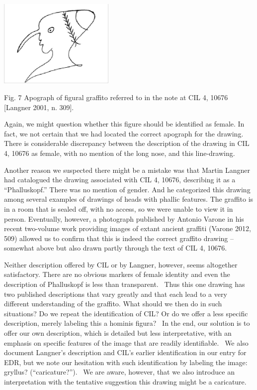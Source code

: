 \documentclass[amsthm,ebook]{saparticle}
\begin{document}
\bigskip

 \includegraphics[width=5.553cm,height=4.217cm]{EAGLE2016BenefielSypniewski-img007.jpg} 

Fig. 7 Apograph of figural graffito referred to in the note at CIL 4, 10676 [Langner 2001, n. 309].


\bigskip

Again, we might question whether this figure should be identified as female. In fact, we not certain that we had located
the correct apograph for the drawing. There is considerable discrepancy between the description of the drawing in CIL
4, 10676 as female, with no mention of the long nose, and this line-drawing. 

Another reason we suspected there might be a mistake was that Martin Langner had catalogued the drawing associated with
CIL 4, 10676, describing it as a “Phalluskopf.” There was no mention of gender. And he categorized this drawing among
several examples of drawings of heads with phallic features. The graffito is in a room that is sealed off, with no
access, so we were unable to view it in person. Eventually, however, a photograph published by Antonio Varone in his
recent two-volume work providing images of extant ancient graffiti (Varone 2012, 509) allowed us to confirm that this
is indeed the correct graffito drawing – somewhat above but also drawn partly through the text of CIL 4, 10676. 

Neither description offered by CIL or by Langner, however, seems altogether satisfactory. There are no obvious markers
of female identity and even the description of Phalluskopf is less than transparent. \ Thus this one drawing has two
published descriptions that vary greatly and that each lead to a very different understanding of the graffito. What
should we then do in such situations? Do we repeat the identification of CIL? Or do we offer a less specific
description, merely labeling this a hominis figura? \ In the end, our solution is to offer our own description, which
is detailed but less interpretative, with an emphasis on specific features of the image that are readily identifiable.
\ We also document Langner’s description and CIL’s earlier identification in our entry for EDR, but we note our
hesitation with such identification by labeling the image: gryllus? (“caricature?”). \ We are aware, however, that we
also introduce an interpretation with the tentative suggestion this drawing might be a caricature. \ \ 
\end{document}
